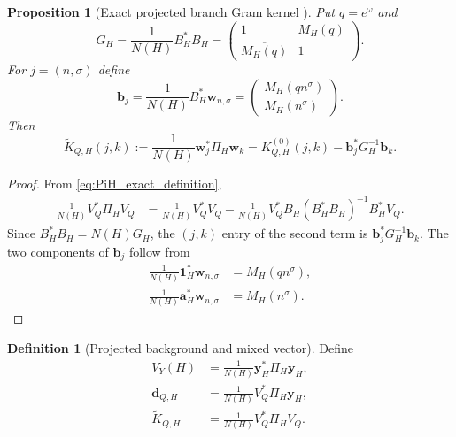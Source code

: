 \documentclass[11pt]{amsart}
\numberwithin{equation}{section}
\theoremstyle{plain}
\newtheorem{proposition}[theorem]{Proposition}
\theoremstyle{definition}
\newtheorem{definition}[theorem]{Definition}
\theoremstyle{remark}
\newcommand{\1}{\mathbf{1}}
\begin{document}
\begin{proposition}[Exact projected branch Gram kernel {}]
\label{prop:schur_kernel}
Put $q=e^\omega$ and
\begin{equation}
G_H
=
\frac1{N(H)}B_H^\ast B_H
=
\begin{pmatrix}
1&M_H(q)\\
\overline{M_H(q)}&1
\end{pmatrix}.
\label{eq:joint_gram}
\end{equation}
For $j=(n,\sigma)$ define
\begin{equation}
\mathbf b_j
=
\frac1{N(H)}B_H^\ast\mathbf w_{n,\sigma}
=
\begin{pmatrix}
M_H(qn^\sigma)\\
M_H(n^\sigma)
\end{pmatrix}.
\label{eq:branch_projection_vector}
\end{equation}
Then
\begin{equation}
\boxed{
\widetilde K_{Q,H}(j,k)
:=
\frac1{N(H)}\mathbf w_j^\ast\Pi_H\mathbf w_k
=
K^{(0)}_{Q,H}(j,k)
-
\mathbf b_j^\ast G_H^{-1}\mathbf b_k.
}
\label{eq:schur_kernel_formula}
\end{equation}
\end{proposition}

\begin{proof}
From \eqref{eq:PiH_exact_definition},
\begin{align}
\frac1{N(H)}V_Q^\ast\Pi_HV_Q
&=
\frac1{N(H)}V_Q^\ast V_Q
-
\frac1{N(H)}V_Q^\ast B_H
(B_H^\ast B_H)^{-1}B_H^\ast V_Q.
\label{eq:projected_gram_matrix_expansion}
\end{align}
Since $B_H^\ast B_H=N(H)G_H$, the $(j,k)$ entry of the second term is
$\mathbf b_j^\ast G_H^{-1}\mathbf b_k$.  The two components of
$\mathbf b_j$ follow from
\begin{align}
\frac1{N(H)}\mathbf 1_H^\ast\mathbf w_{n,\sigma}
&=
M_H(qn^\sigma),
\label{eq:branch_projection_constant_component}
\\
\frac1{N(H)}\mathbf a_H^\ast\mathbf w_{n,\sigma}
&=
M_H(n^\sigma).
\label{eq:branch_projection_carrier_component}
\end{align}
\end{proof}

\begin{definition}[Projected background and mixed vector]
\label{def:background_mixed_vector}
Define
\begin{align}
V_Y(H)
&=
\frac1{N(H)}\mathbf y_H^\ast\Pi_H\mathbf y_H,
\label{eq:projected_background_energy}
\\
\mathbf d_{Q,H}
&=
\frac1{N(H)}V_Q^\ast\Pi_H\mathbf y_H,
\label{eq:mixed_background_prime_vector}
\\
\widetilde K_{Q,H}
&=
\frac1{N(H)}V_Q^\ast\Pi_HV_Q.
\label{eq:projected_prime_gram_matrix}
\end{align}
\end{definition}
\end{document}
